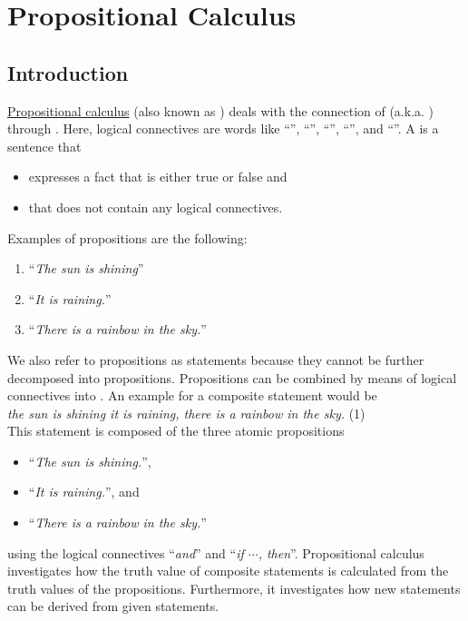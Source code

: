\chapter{Propositional Calculus}
\section{Introduction}
\href{https://en.wikipedia.org/wiki/Propositional_calculus}{Propositional calculus}
(also known as ) deals with the connection of 
(a.k.a. ) through 
.  Here, logical connectives are words like ``'', ``'',
``'', ``'', and ``''.  A
 is a sentence  that 
\begin{itemize}
\item expresses a fact that is either true or false and
\item that does not contain any logical connectives.
\end{itemize}
Examples of propositions are the following:
\begin{enumerate}
\item ``\textsl{The sun is shining}''
\item ``\textsl{It is raining.}''
\item ``\textsl{There is a rainbow in the sky.}''
\end{enumerate}
We also refer to propositions as  statements because they 
cannot be further decomposed into propositions.  Propositions can be combined by means of logical connectives
into .  An example for a
composite statement would be
\\[0.2cm] 
\hspace*{1.3cm}
\textsl{ the sun is shining  it is raining,  there is a rainbow in the sky.} 
\hspace*{\fill} (1)
\\[0.2cm]
This statement is composed of the three atomic propositions
\begin{itemize}
\item ``\textsl{The sun is shining.}'', 
\item ``\textsl{It is raining.}'', and
\item ``\textsl{There is a rainbow in the sky.}''
\end{itemize}
using the logical connectives ``\textsl{and}'' and ``\textsl{if $\cdots$, then}''.
Propositional calculus investigates how the truth value of composite statements is
calculated from the truth values of the propositions.  Furthermore, it investigates
how new statements can be derived from given statements. 

